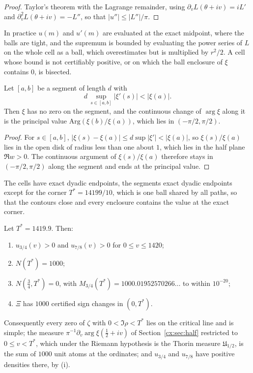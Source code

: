 \begin{proof}
Taylor's theorem with the Lagrange remainder, using $\partial_vL(\theta+iv)=iL'$ and $\partial_v^2L(\theta+iv)=-L''$, so that $|u''|\le|L''|/\pi$.
\end{proof}

In practice $u(m)$ and $u'(m)$ are evaluated at the exact midpoint, where the balls are tight, and the supremum is bounded by evaluating the power series of $L$ on the whole cell as a ball, which overestimates but is multiplied by $r^2/2$. A cell whose bound is not certifiably positive, or on which the ball enclosure of $\xi$ contains $0$, is bisected.

\begin{lemma}[segment]\label{cx:lem:segment}
Let $[a,b]$ be a segment of length $d$ with
\[
d\,\sup_{s\in[a,b]}|\xi'(s)|<|\xi(a)|.
\]
Then $\xi$ has no zero on the segment, and the continuous change of $\arg\xi$ along it is the principal value $\mathrm{Arg}(\xi(b)/\xi(a))$, which lies in $(-\pi/2,\pi/2)$.
\end{lemma}

\begin{proof}
For $s\in[a,b]$, $|\xi(s)-\xi(a)|\le d\sup|\xi'|<|\xi(a)|$, so $\xi(s)/\xi(a)$ lies in the open disk of radius less than one about $1$, which lies in the half plane $\Re w>0$. The continuous argument of $\xi(s)/\xi(a)$ therefore stays in $(-\pi/2,\pi/2)$ along the segment and ends at the principal value.
\end{proof}

The cells have exact dyadic endpoints, the segments exact dyadic endpoints except for the corner $T^*=14199/10$, which is one ball shared by all paths, so that the contours close and every enclosure contains the value at the exact corner.

\begin{theorem}[certified]\label{cx:thm:certified}
Let $T^*=1419.9$. Then:
\begin{enumerate}
\item[(i)] $u_{3/4}(v)>0$ and $u_{7/8}(v)>0$ for $0\le v\le 1420$;
\item[(ii)] $N(T^*)=1000$;
\item[(iii)] $N(\tfrac34,T^*)=0$, with $M_{3/4}(T^*)=1000.01952570266\ldots$ to within $10^{-20}$;
\item[(iv)] $\Xi$ has $1000$ certified sign changes in $(0,T^*)$.
\end{enumerate}
Consequently every zero of $\zeta$ with $0<\Im\rho<T^*$ lies on the critical line and is simple; the measure $\pi^{-1}\partial_v\arg\xi(\tfrac12+iv)$ of Section~\ref{cx:sec:half} restricted to $0\le v<T^*$, which under the Riemann hypothesis is the Thorin measure $\mathfrak U_{1/2}$, is the sum of $1000$ unit atoms at the ordinates; and $u_{3/4}$ and $u_{7/8}$ have positive densities there, by (i).
\end{theorem}

